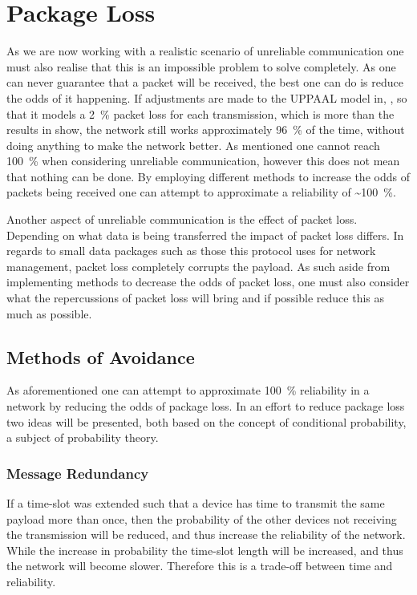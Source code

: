 \section{Package Loss}
As we are now working with a realistic scenario of unreliable communication one must also realise that this is an impossible problem to solve completely.
As one can never guarantee that a packet will be received, the best one can do is reduce the odds of it happening.
If adjustments are made to the UPPAAL model in, , so that it models a 2~\% packet loss for each transmission, which is more than the results in  show, the network still works approximately 96~\% of the time, without doing anything to make the network better.
As mentioned one cannot reach 100~\% when considering unreliable communication, however this does not mean that nothing can be done.
By employing different methods to increase the odds of packets being received one can attempt to approximate a reliability of \textasciitilde100~\%.

Another aspect of unreliable communication is the effect of packet loss.
Depending on what data is being transferred the impact of packet loss differs.
In regards to small data packages such as those this protocol uses for network management, packet loss completely corrupts the payload.
As such aside from implementing methods to decrease the odds of packet loss, one must also consider what the repercussions of packet loss will bring and if possible reduce this as much as possible. 

\subsection{Methods of Avoidance}\label{sub:avoidance}
As aforementioned one can attempt to approximate 100~\% reliability in a network by reducing the odds of package loss.
In an effort to reduce package loss two ideas will be presented, both based on the concept of conditional probability, a subject of probability theory.

\subsubsection*{Message Redundancy}\label{redundancy}
If a time-slot was extended such that a device has time to transmit the same payload more than once, then the probability of the other devices not receiving the transmission will be reduced, and thus increase the reliability of the network.
While the increase in probability the time-slot length will be increased, and thus the network will become slower.
Therefore this is a trade-off between time and reliability. 

